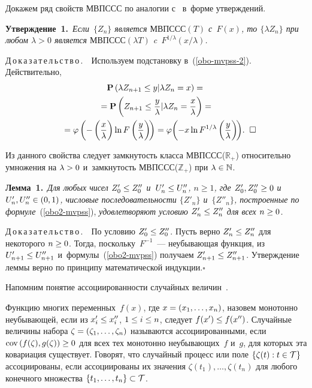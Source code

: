 \begin{multicols}{2}
Докажем ряд свойств МВПССС по аналогии с~\cite{Leb-2005d} в~форме утверж\-де\-ний.

\smallskip

\noindent
\textbf{Утверждение~1.}\ \textit{Если~$\{Z_n\}$ является $\mathrm{МВПССС}(T)$ с~$F(x)$, то
$\{\lambda Z_n\}$ при любом $\lambda>0$ является $\mathrm{МВПССС}(\lambda T)$ 
c~$F^{1/\lambda}(x/\lambda)$.}

\smallskip

\noindent
Д\,о\,к\,а\,з\,а\,т\,е\,л\,ь\,с\,т\,в\,о\,.\ \
Используем подстановку в~(\ref{obo-mvpss-2}).
Действительно,
\begin{multline*}
{\bf P}\left(\lambda Z_{n+1}\le y|\lambda Z_n=x\right)={}\\
{}=
{\bf P}\left(Z_{n+1}\le \fr{y}{\lambda}|\lambda Z_n=\fr{x}{\lambda}\right)={}\\
\!{}=\varphi\left(-\left(\fr{x}{\lambda}\right)\ln 
F\left(\fr{y}{\lambda}\right)\!\right)=
\varphi\!\left(-x\ln F^{1/\lambda}\left(\fr{y}{\lambda}\right)\!\right)\!.\hspace*{2mm}\square\hspace*{-8.36485pt}
\end{multline*}

Из данного свойства следует замк\-ну\-тость класса МВПССС($\mathbb{R}_+$) относительно
умножения на $\lambda\hm>0$ и~замк\-ну\-тость МВПССС($\mathbb{Z}_+$) при $\lambda
\hm\in \mathbb{N}$.

\smallskip

\noindent
\textbf{Лемма~1.}\ \textit{Для любых чисел $Z'_0\hm\le Z''_0$ и~$U'_n\hm\le U''_n$,
$n\ge 1$, где $Z'_0, Z''_0\hm\ge 0$ и~$U'_n,U''_n\hm\in (0,1)$, чис\-ло\-вые
последовательности $\{Z'_n\}$ и~$\{Z''_n\}$, по\-стро\-ен\-ные по формуле}~(\ref{obo2-mvpss}), 
\textit{удовле\-тво\-ря\-ют условию $Z'_n\hm\le Z''_n$ для всех $n\hm\ge 0$.}

\smallskip

\noindent
Д\,о\,к\,а\,з\,а\,т\,е\,л\,ь\,с\,т\,в\,о\,.\ \
По условию $Z'_0\hm\le Z''_0$. Пусть верно
$Z'_n\hm\le Z''_n$ для некоторого $n\hm\ge 0$. Тогда, поскольку~$F^{-1}$~---
не\-убы\-ва\-ющая функция, из $U'_{n+1}\hm\le U''_{n+1}$ и~формулы~(\ref{obo2-mvpss})
получаем $Z'_{n+1}\hm\le Z''_{n+1}$. Утверж\-де\-ние лем\-мы вер\-но по принципу
математической индукции.\hfill$\square$


\smallskip


Напомним понятие ассоциированности случайных величин~\cite{EPW, Bul}.

Функцию многих переменных~$f(x)$, где $x\hm=(x_1,\dots , x_n)$, назовем
монотонно неубывающей, если из $x'_i\hm\le x''_i$, $1\hm\le i\hm\le n$, следует
$f(x')\hm\le f(x'')$. Случайные величины набора $\zeta\hm=(\zeta_1,\dots,\zeta_n)$
называются ассоциированными, если $\mathrm{cov}\,(f(\zeta),g(\zeta))\hm\ge 0$ для
всех тех монотонно неубывающих~$f$ и~$g$, для которых эта ковариация
существует. Говорят, что случайный процесс или поле $\{\zeta(t): t\hm\in
{\cal T}\}$ ассоциированы, если ассоциированы их значения $\zeta(t_1),
\dots,\zeta(t_n)$ для любого конечного множества $\{t_1,\dots,t_n\}\hm\subset
{\cal T}$.


\end{multicols}
